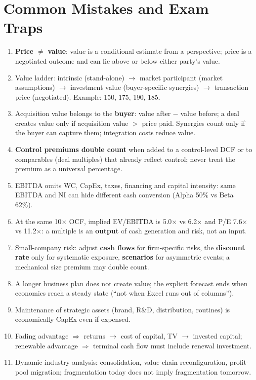\section{Common Mistakes and Exam Traps}
\begin{trapbox}
\begin{enumerate}[leftmargin=*]
  \item \textbf{Price $\neq$ value}: value is a conditional estimate from a perspective; price is a negotiated outcome and can lie above or below either party's value.
  \item Value ladder: intrinsic (stand-alone) $\to$ market participant (market assumptions) $\to$ investment value (buyer-specific synergies) $\to$ transaction price (negotiated). Example: 150, 175, 190, 185.
  \item Acquisition value belongs to the \textbf{buyer}: value after $-$ value before; a deal creates value only if acquisition value $>$ price paid. Synergies count only if the buyer can capture them; integration costs reduce value.
  \item \textbf{Control premiums double count} when added to a control-level DCF or to comparables (deal multiples) that already reflect control; never treat the premium as a universal percentage.
  \item EBITDA omits WC, CapEx, taxes, financing and capital intensity: same EBITDA and NI can hide different cash conversion (Alpha 50\% vs Beta 62\%).
  \item At the same 10$\times$ OCF, implied EV/EBITDA is 5.0$\times$ vs 6.2$\times$ and P/E 7.6$\times$ vs 11.2$\times$: a multiple is an \textbf{output} of cash generation and risk, not an input.
  \item Small-company risk: adjust \textbf{cash flows} for firm-specific risks, the \textbf{discount rate} only for systematic exposure, \textbf{scenarios} for asymmetric events; a mechanical size premium may double count.
  \item A longer business plan does not create value; the explicit forecast ends when economics reach a steady state (``not when Excel runs out of columns'').
  \item Maintenance of strategic assets (brand, R\&D, distribution, routines) is economically CapEx even if expensed.
  \item Fading advantage $\Rightarrow$ returns $\to$ cost of capital, TV $\to$ invested capital; renewable advantage $\Rightarrow$ terminal cash flow must include renewal investment.
  \item Dynamic industry analysis: consolidation, value-chain reconfiguration, profit-pool migration; fragmentation today does not imply fragmentation tomorrow.

\end{enumerate}
\end{trapbox}

